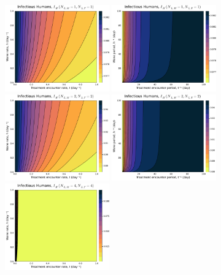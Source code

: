 \documentclass[12pt]{article}
\begin{document}
\begin{figure}[H]
    \centering
    \includegraphics[width=0.4\textwidth]{../../fig/gen_model/IH_rates_txh_1x1.pdf}
    \includegraphics[width=0.4\textwidth]{../../fig/gen_model/IH_periods_txh_1x1.pdf}\\
    \includegraphics[width=0.4\textwidth]{../../fig/gen_model/IH_rates_txh_2x2.pdf}
    \includegraphics[width=0.4\textwidth]{../../fig/gen_model/IH_periods_txh_2x2.pdf}\\
    \includegraphics[width=0.4\textwidth]{../../fig/gen_model/IH_rates_txh_4x4.pdf}

\end{figure}
\end{document}
